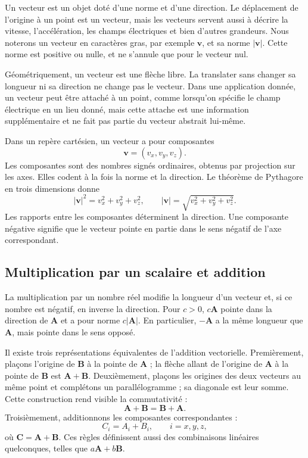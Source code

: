 Un vecteur est un objet doté d’une norme et d’une direction. Le déplacement de l’origine à un point est un vecteur, mais les vecteurs servent aussi à décrire la vitesse, l’accélération, les champs électriques et bien d’autres grandeurs. Nous noterons un vecteur en caractères gras, par exemple \(\mathbf v\), et sa norme \(\lvert\mathbf v\rvert\). Cette norme est positive ou nulle, et ne s’annule que pour le vecteur nul.

Géométriquement, un vecteur est une flèche libre. La translater sans changer sa longueur ni sa direction ne change pas le vecteur. Dans une application donnée, un vecteur peut être attaché à un point, comme lorsqu’on spécifie le champ électrique en un lieu donné, mais cette attache est une information supplémentaire et ne fait pas partie du vecteur abstrait lui-même.

Dans un repère cartésien, un vecteur a pour composantes
\begin{equation}
  \mathbf v=(v_x,v_y,v_z).
\end{equation}
Les composantes sont des nombres signés ordinaires, obtenus par projection sur les axes. Elles codent à la fois la norme et la direction. Le théorème de Pythagore en trois dimensions donne
\begin{equation}
  \lvert\mathbf v\rvert^2
  =v_x^2+v_y^2+v_z^2,
  \qquad
  \lvert\mathbf v\rvert
  =\sqrt{v_x^2+v_y^2+v_z^2}.
  \label{eq:vector-magnitude}
\end{equation}
Les rapports entre les composantes déterminent la direction. Une composante négative signifie que le vecteur pointe en partie dans le sens négatif de l’axe correspondant.

\subsection{Multiplication par un scalaire et addition}

La multiplication par un nombre réel modifie la longueur d’un vecteur et, si ce nombre est négatif, en inverse la direction. Pour \(c>0\), \(c\mathbf A\) pointe dans la direction de \(\mathbf A\) et a pour norme \(c\lvert\mathbf A\rvert\). En particulier, \(-\mathbf A\) a la même longueur que \(\mathbf A\), mais pointe dans le sens opposé.

Il existe trois représentations équivalentes de l’addition vectorielle. Premièrement, plaçons l’origine de \(\mathbf B\) à la pointe de \(\mathbf A\) ; la flèche allant de l’origine de \(\mathbf A\) à la pointe de \(\mathbf B\) est \(\mathbf A+\mathbf B\).
Deuxièmement, plaçons les origines des deux vecteurs au même point et complétons un parallélogramme ; sa diagonale est leur somme. Cette construction rend visible la commutativité :
\begin{equation}
  \mathbf A+\mathbf B=\mathbf B+\mathbf A.
\end{equation}
Troisièmement, additionnons les composantes correspondantes :
\begin{equation}
  C_i=A_i+B_i,
  \qquad i=x,y,z,
  \label{eq:component-addition}
\end{equation}
où \(\mathbf C=\mathbf A+\mathbf B\). Ces règles définissent aussi des combinaisons linéaires quelconques, telles que \(a\mathbf A+b\mathbf B\).

